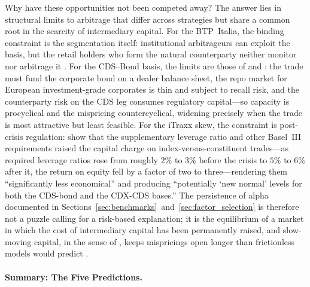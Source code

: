 Why have these opportunities not been competed away? The answer lies in
structural limits to arbitrage that differ across strategies but share
a common root in the scarcity of intermediary capital. For the
BTP~Italia, the binding constraint is the segmentation itself:
institutional arbitrageurs can exploit the basis, but the retail
holders who form the natural counterparty neither monitor nor arbitrage
it \citep{vayanos2021preferred}. For the CDS--Bond basis, the limits
are those of \citet{bai2019cds} and \citet{mitchell2012arbitrage}: the
trade must fund the corporate bond on a dealer balance sheet, the repo
market for European investment-grade corporates is thin and subject to
recall risk, and the counterparty risk on the CDS leg consumes
regulatory capital---so capacity is procyclical and the mispricing
countercyclical, widening precisely when the trade is most attractive
but least feasible. For the iTraxx skew, the constraint is post-crisis
regulation: \citet{boyarchenko2016trends} show that the supplementary
leverage ratio and other Basel~III requirements raised the capital
charge on index-versus-constituent trades---as required leverage ratios
rose from roughly $2\%$ to $3\%$ before the crisis to $5\%$ to $6\%$ after it, the
return on equity fell by a factor of two to three---rendering them
``significantly less economical'' and producing ``potentially `new
normal' levels for both the CDS-bond and the CDX-CDS bases.'' The
persistence of alpha documented in
Sections~\ref{sec:benchmarks}~and~\ref{sec:factor_selection} is
therefore not a puzzle calling for a risk-based explanation; it is the
equilibrium of a market in which the cost of intermediary capital has
been permanently raised, and slow-moving capital, in the sense of
\citet{duffie2010presidential}, keeps mispricings open longer than
frictionless models would predict \citep{mitchell2007slow}.

\paragraph{Summary: The Five Predictions.}

